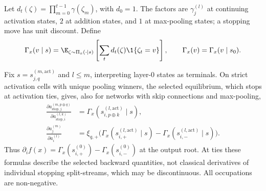 \begin{definition}\label{ptnb:def:occupation}
Let $d_t(\zeta)=\prod_{m=0}^{t-1}\gamma(\zeta_m)$, with $d_0=1$.
The factors are $\gamma_j^{(l)}$ at continuing activation states, $2$ at addition states, and $1$
at max-pooling states; a stopping move has unit discount. Define
\begin{equation}\label{ptnb:eq:attribution}
    \Gamma_x(v\mid s)=\E_{\zeta\sim\Pi_x(\cdot\mid s)}
       \left[\sum_t d_t(\zeta)\1\{\zeta_t=v\}\right],
    \qquad \Gamma_x(v)=\Gamma_x(v\mid s_0).
\end{equation}
\end{definition}

\begin{theoremenv}\label{ptnb:thm:deriv-occ}\label{thm:gradient_occupation}\label{ptnb:thm:gradient}
Fix $s=s_{j,q}^{(m,\mathrm{act})}$ and $l\leq m$, interpreting layer-$0$ states as terminals.
On strict activation cells with unique pooling winners, the selected
equilibrium, which stops at activation ties, gives, also for networks with skip connections and max-pooling,
\begin{align}
 \frac{\partial a_{\mathrm{stop},j}^{(m,p\oplus q)}}
      {\partial a_{\mathrm{stop},i}^{(l,k)}}
    &=\Gamma_x(s_{i,p\oplus k}^{(l,\mathrm{act})}\mid s),\\
 \frac{\partial a_j^{(m)}}{\partial a_i^{(l)}}
    &=\xi_{q,+}\bigl(\Gamma_x(s_{i,+}^{(l,\mathrm{act})}\mid s)
                   -\Gamma_x(s_{i,-}^{(l,\mathrm{act})}\mid s)\bigr).
\end{align}
Thus $\partial_i f(x)=\Gamma_x(s_{i,+}^{(0)})-\Gamma_x(s_{i,-}^{(0)})$ at the output root.
At ties these formulas describe the selected backward quantities, not classical derivatives of
individual stopping split-streams, which may be discontinuous. All occupations are non-negative.
\end{theoremenv}

